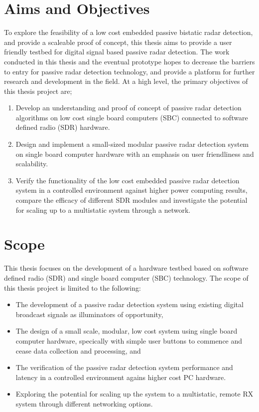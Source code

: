 \section{Aims and Objectives \label{sec:aims}}
To explore the feasibility of a low cost embedded passive bistatic radar detection, and provide a scaleable proof of concept, this thesis aims to provide a user friendly testbed for digital signal based passive radar detection. The work conducted in this thesis and the eventual prototype hopes to decrease the barriers to entry for passive radar detection technology, and provide a platform for further research and development in the field. At a high level, the primary objectives of this thesis project are;
\begin{enumerate}
    \item Develop an understanding and proof of concept of passive radar detection algorithms on low cost single board computers (SBC) connected to software defined radio (SDR) hardware.
    \item Design and implement a small-sized modular passive radar detection system on single board computer hardware with an emphasis on user friendliness and scalability.
    \item Verify the functionality of the low cost embedded passive radar detection system in a controlled environment against higher power computing results, compare the efficacy of different SDR modules and investigate the potential for scaling up to a multistatic system through a network. 
\end{enumerate}

\section{Scope \label{sec:thesisScope}}
This thesis focuses on the development of a hardware testbed based on software defined radio (SDR) and single board computer (SBC) technology. The scope of this thesis project is limited to the following:

\begin{itemize}
    \item The development of a passive radar detection system using existing digital broadcast signals as illuminators of opportunity,
    \item The design of a small scale, modular, low cost system using single board computer hardware, specically with simple user buttons to commence and cease data collection and processing, and 
    \item The verification of the passive radar detection system performance and latency in a controlled environment agains higher cost PC hardware.
    \item Exploring the potential for scaling up the system to a multistatic, remote RX system through different networking options.
\end{itemize}

